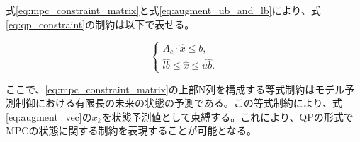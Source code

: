 式\eqref{eq:mpc_constraint_matrix}と式\eqref{eq:augment_ub_and_lb}により、式\eqref{eq:qp_constraint}の制約は以下で表せる。

\begin{equation}
  \begin{cases}
    A_{c} \cdot \hat{x} \leq b, \\
    \hat{lb} \leq \hat{x} \leq \hat{ub}.
  \end{cases}
  \label{eq:qp_augment_constraint}
\end{equation}





ここで、\eqref{eq:mpc_constraint_matrix}の上部N列を構成する等式制約はモデル予測制御における有限長の未来の状態の予測である。この等式制約により、式\eqref{eq:augment_vec}の$x_{k}$を状態予測値として束縛する。これにより、QPの形式でMPCの状態に関する制約を表現することが可能となる。

